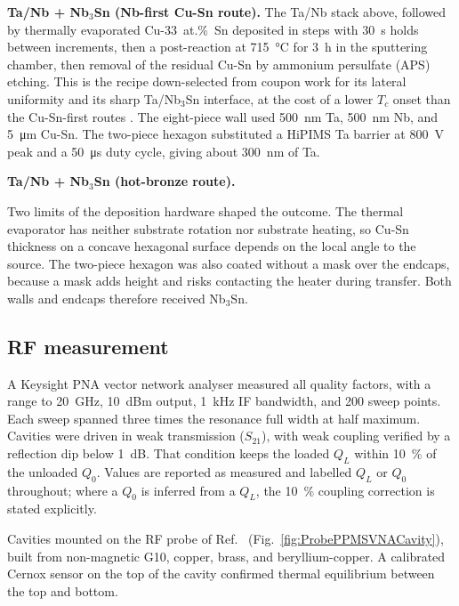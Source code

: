 \textbf{Ta/Nb + Nb$_3$Sn (Nb-first Cu-Sn route).} The Ta/Nb stack above, followed by thermally evaporated Cu-33~at.\%~Sn deposited in steps with \qty{30}{\second} holds between increments, then a post-reaction at \qty{715}{\degreeCelsius} for \qty{3}{\hour} in the sputtering chamber, then removal of the residual Cu-Sn by ammonium persulfate (APS) etching. This is the recipe down-selected from coupon work for its lateral uniformity and its sharp Ta/Nb$_3$Sn interface, at the cost of a lower $T_c$ onset than the Cu-Sn-first routes . The eight-piece wall used \qty{500}{\nano\meter} Ta, \qty{500}{\nano\meter} Nb, and \qty{5}{\micro\meter} Cu-Sn. The two-piece hexagon substituted a HiPIMS Ta barrier at \qty{800}{\volt} peak and a \qty{50}{\micro\second} duty cycle, giving about \qty{300}{\nano\meter} of Ta.

\textbf{Ta/Nb + Nb$_3$Sn (hot-bronze route).} 

Two limits of the deposition hardware shaped the outcome. The thermal evaporator has neither substrate rotation nor substrate heating, so Cu-Sn thickness on a concave hexagonal surface depends on the local angle to the source. The two-piece hexagon was also coated without a mask over the endcaps, because a mask adds height and risks contacting the heater during transfer. Both walls and endcaps therefore received Nb$_3$Sn.

\subsection{RF measurement}

A Keysight PNA vector network analyser measured all quality factors, with a range to \qty{20}{\giga\hertz}, \qty{10}{dBm} output, \qty{1}{\kilo\hertz} IF bandwidth, and 200 sweep points. Each sweep spanned three times the resonance full width at half maximum. Cavities were driven in weak transmission ($S_{21}$), with weak coupling verified by a reflection dip below \qty{1}{dB}. That condition keeps the loaded $Q_L$ within \qty{10}{\percent} of the unloaded $Q_0$. Values are reported as measured and labelled $Q_L$ or $Q_0$ throughout; where a $Q_0$ is inferred from a $Q_L$, the \qty{10}{\percent} coupling correction is stated explicitly.

Cavities mounted on the RF probe of Ref.~\cite{Braine:2024nzi} (Fig.~\ref{fig:ProbePPMSVNACavity}), built from non-magnetic G10, copper, brass, and beryllium-copper. A calibrated Cernox sensor on the top of the cavity confirmed thermal equilibrium between the top and bottom.

